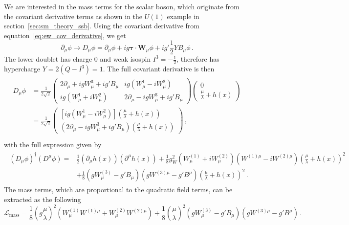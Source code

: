 We are interested in the mass terms for the scalar boson, which originate from the covariant derivative terms as shown in the $U(1)$ example in section~\ref{sec:sm_theory_ssb}. Using the covariant derivative from equation~\ref{eq:ew_cov_derivative}, we get
\begin{equation}
	\partial_\mu\phi\to D_\mu\phi=\partial_\mu\phi+ig\boldsymbol{\tau}\cdot\mathbf{W}_\mu\phi+ig'\frac{1}{2}YB_\mu\phi\,.
\end{equation}
The lower doublet has charge 0 and weak isospin $I^3=-\frac{1}{2}$, therefore has hypercharge $Y=2(Q-I^3)=1$. The full covariant derivative is then
\begin{align}
	\begin{split}
		D_\mu\phi&=\frac{1}{2\sqrt{2}}\begin{pmatrix}2\partial_\mu+igW_\mu^3+ig'B_\mu&ig(W_\mu^1-iW_\mu^2)\\ig(W_\mu^1+iW_\mu^2)&2\partial_\mu-igW_\mu^3+ig'B_\mu\end{pmatrix}\begin{pmatrix}0\\\frac{\mu}{\lambda}+h(x)\end{pmatrix}\\
		&=\frac{1}{2\sqrt{2}}\begin{pmatrix}\left[ig(W_\mu^1-iW_\mu^2)\right]\left(\frac{\mu}{\lambda}+h(x)\right)\\\left(2\partial_\mu-igW_\mu^3+ig'B_\mu\right)\left(\frac{\mu}{\lambda}+h(x)\right)\end{pmatrix}\,,\\
	\end{split}
\end{align}
with the full expression given by
\begin{align}
	\begin{split}
		\left(D_\mu\phi\right)^\dagger\left(D^\mu\phi\right)=&\frac{1}{2}\left(\partial_\mu h(x)\right)\left(\partial^\mu h(x)\right)+\frac{1}{8}g_W^2\left(W_\mu^{(1)}+iW_\mu^{(2)}\right)\left(W^{(1)\mu}-iW^{(2)\mu}\right)\left(\frac{\mu}{\lambda}+h(x)\right)^2\\
		&+\frac{1}{8}\left(gW_\mu^{(3)}-g'B_\mu\right)\left(gW^{(3)\mu}-g'B^\mu\right)\left(\frac{\mu}{\lambda}+h(x)\right)^2\,.
	\end{split}
\end{align}
The mass terms, which are proportional to the quadratic field terms, can be extracted as the following
\begin{equation}
	\mathcal{L}_\text{mass}=\frac{1}{8}(g\frac{\mu}{\lambda})^2\left(W_\mu^{(1)}W^{(1)\mu}+W_\mu^{(2)}W^{(2)\mu}\right)+\frac{1}{8}\left(\frac{\mu}{\lambda}\right)^2\left(gW_\mu^{(3)}-g'B_\mu\right)\left(gW^{(3)\mu}-g'B^\mu\right)\,.
\end{equation}
